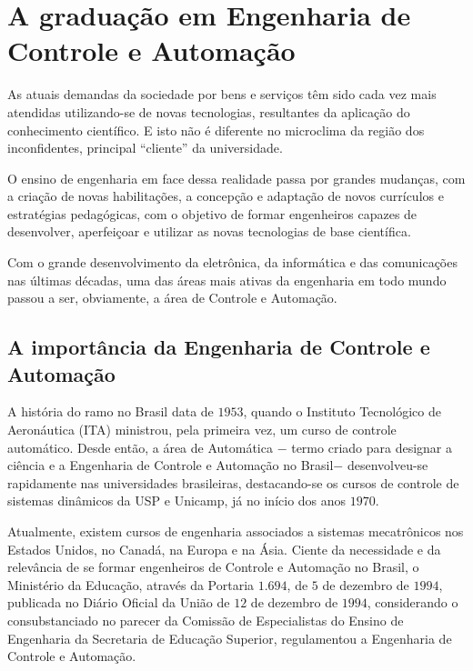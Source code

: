 \chapter{A gradua{\c c}{\~a}o em Engenharia de Controle e Automa{\c c}{\~a}o}
As atuais demandas da sociedade por bens e servi{\c c}os t{\^e}m sido cada vez mais atendidas utilizando-se de novas tecnologias, resultantes da aplica{\c c}{\~a}o do conhecimento cient{\'i}fico. E isto não é diferente no microclima da região dos inconfidentes, principal ``cliente'' da universidade.

O ensino de engenharia em face dessa realidade passa por grandes mudan{\c c}as, com a cria{\c c}{\~a}o de novas habilita{\c c}{\~o}es, a concep{\c c}{\~a}o e adaptação de novos curr{\'i}culos e estrat{\'e}gias pedag{\'o}gicas, com o objetivo de formar engenheiros capazes de desenvolver, aperfei{\c c}oar e utilizar as novas tecnologias de base cient{\'i}fica.
 
Com o grande desenvolvimento da eletr{\^o}nica, da inform{\'a}tica e das comunicações nas últimas d{\'e}cadas, uma das {\'a}reas mais ativas da engenharia em todo mundo passou a ser, obviamente, a {\'a}rea de Controle e Automa{\c c}{\~a}o.

\section{A importância da Engenharia de Controle e Automa{\c c}{\~a}o}
\label{sec:controleeautomacao}
A hist{\'o}ria do ramo no Brasil data de $1953$, quando o Instituto Tecnol{\'o}gico de Aeron{\'a}utica (ITA) ministrou, pela primeira vez, um curso de controle autom{\'a}tico. Desde ent{\~a}o, a {\'a}rea de Autom{\'a}tica $-$ termo criado para designar a ci{\^e}ncia e a Engenharia de Controle e Automa{\c c}{\~a}o no Brasil$-$ desenvolveu-se rapidamente nas universidades brasileiras, destacando-se os cursos de controle de sistemas din{\^a}micos da USP e Unicamp, j{\'a} no in{\'i}cio dos anos $1970$. 

Atualmente, existem cursos de engenharia associados a sistemas mecatr{\^o}nicos nos Estados Unidos, no Canad{\'a}, na Europa e na {\'A}sia. Ciente da necessidade e da relev{\^a}ncia de se formar engenheiros de Controle e Automa{\c c}{\~a}o no Brasil, o Minist{\'e}rio da Educa{\c c}{\~a}o, atrav{\'e}s da Portaria $1.694$, de $5$ de dezembro de $1994$, publicada no Di{\'a}rio Oficial da Uni{\~a}o de $12$ de dezembro de $1994$, considerando o consubstanciado no parecer da Comiss{\~a}o de Especialistas do Ensino de Engenharia da Secretaria de Educa{\c c}{\~a}o Superior, regulamentou a Engenharia de Controle e Automa{\c c}{\~a}o.

